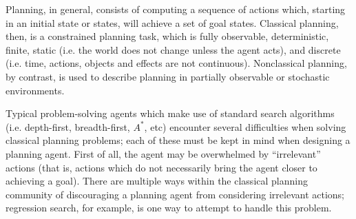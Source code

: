 Planning, in general, consists of computing a sequence of actions which, starting in an initial state or states, will achieve a set of goal states. Classical planning, then, is a constrained planning task, which is fully observable, deterministic, finite, static (i.e. the world does not change unless the agent acts), and discrete (i.e. time, actions, objects and effects are not continuous). Nonclassical planning, by contrast, is used to describe planning in partially observable or stochastic environments. 

Typical problem-solving agents which make use of standard search algorithms (i.e. depth-first, breadth-first, $A^*$, etc) encounter several difficulties when solving classical planning problems; each of these must be kept in mind when designing a planning agent. First of all, the agent may be overwhelmed by ``irrelevant'' actions (that is, actions which do not necessarily bring the agent closer to achieving a goal). There are multiple ways within the classical planning community of discouraging a planning agent from considering irrelevant actions; regression search, for example, is one way to attempt to handle this problem. 